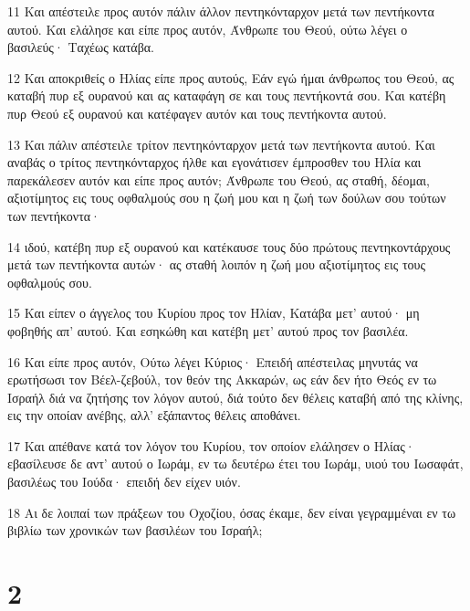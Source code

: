 \par 11 Και απέστειλε προς αυτόν πάλιν άλλον πεντηκόνταρχον μετά των πεντήκοντα αυτού. Και ελάλησε και είπε προς αυτόν, Άνθρωπε του Θεού, ούτω λέγει ο βασιλεύς· Ταχέως κατάβα.
\par 12 Και αποκριθείς ο Ηλίας είπε προς αυτούς, Εάν εγώ ήμαι άνθρωπος του Θεού, ας καταβή πυρ εξ ουρανού και ας καταφάγη σε και τους πεντήκοντά σου. Και κατέβη πυρ Θεού εξ ουρανού και κατέφαγεν αυτόν και τους πεντήκοντα αυτού.
\par 13 Και πάλιν απέστειλε τρίτον πεντηκόνταρχον μετά των πεντήκοντα αυτού. Και αναβάς ο τρίτος πεντηκόνταρχος ήλθε και εγονάτισεν έμπροσθεν του Ηλία και παρεκάλεσεν αυτόν και είπε προς αυτόν; Άνθρωπε του Θεού, ας σταθή, δέομαι, αξιοτίμητος εις τους οφθαλμούς σου η ζωή μου και η ζωή των δούλων σου τούτων των πεντήκοντα·
\par 14 ιδού, κατέβη πυρ εξ ουρανού και κατέκαυσε τους δύο πρώτους πεντηκοντάρχους μετά των πεντήκοντα αυτών· ας σταθή λοιπόν η ζωή μου αξιοτίμητος εις τους οφθαλμούς σου.
\par 15 Και είπεν ο άγγελος του Κυρίου προς τον Ηλίαν, Κατάβα μετ' αυτού· μη φοβηθής απ' αυτού. Και εσηκώθη και κατέβη μετ' αυτού προς τον βασιλέα.
\par 16 Και είπε προς αυτόν, Ούτω λέγει Κύριος· Επειδή απέστειλας μηνυτάς να ερωτήσωσι τον Βέελ-ζεβούλ, τον θεόν της Ακκαρών, ως εάν δεν ήτο Θεός εν τω Ισραήλ διά να ζητήσης τον λόγον αυτού, διά τούτο δεν θέλεις καταβή από της κλίνης, εις την οποίαν ανέβης, αλλ' εξάπαντος θέλεις αποθάνει.
\par 17 Και απέθανε κατά τον λόγον του Κυρίου, τον οποίον ελάλησεν ο Ηλίας· εβασίλευσε δε αντ' αυτού ο Ιωράμ, εν τω δευτέρω έτει του Ιωράμ, υιού του Ιωσαφάτ, βασιλέως του Ιούδα· επειδή δεν είχεν υιόν.
\par 18 Αι δε λοιπαί των πράξεων του Οχοζίου, όσας έκαμε, δεν είναι γεγραμμέναι εν τω βιβλίω των χρονικών των βασιλέων του Ισραήλ;

\chapter{2}

